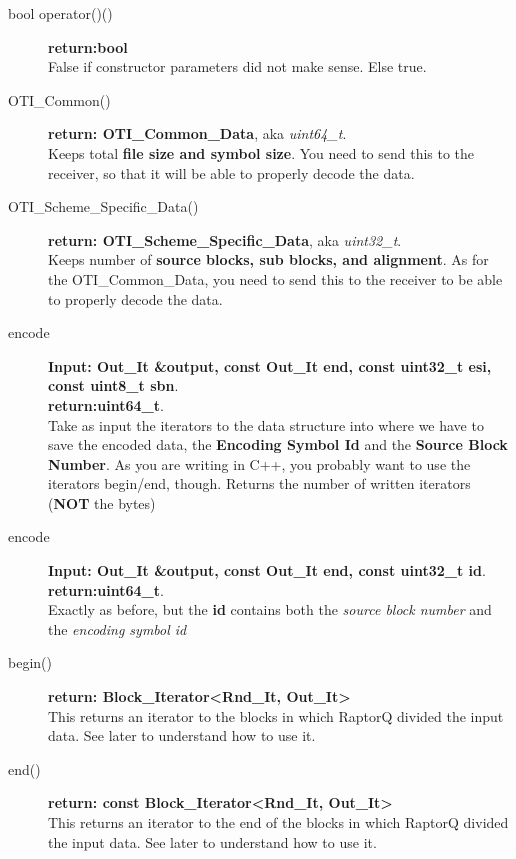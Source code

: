 \documentclass[11pt,a4paper]{refart}
\begin{document}
\begin{description}
\item[bool operator()()] \textbf{return:bool}\\
False if constructor parameters did not make sense. Else true.

\item[OTI\_Common()] \textbf{return: OTI\_Common\_Data}, aka \textit{uint64\_t}.\\
Keeps total \textbf{file size and symbol size}. You need to send this to the receiver, so that it will be able to properly decode the data.

\item[OTI\_Scheme\_Specific\_Data()] \textbf{return: OTI\_Scheme\_Specific\_Data}, aka \textit{uint32\_t}.\\
Keeps number of \textbf{source blocks, sub blocks, and alignment}. As for the OTI\_Common\_Data, you need to send this to the receiver to be able to
properly decode the data.

\item[encode] \textbf{Input: Out\_It \&output, const Out\_It end, const uint32\_t esi, const uint8\_t sbn}.\\
\textbf{return:uint64\_t}.\\
Take as input the iterators to the data structure into where we have to save the encoded data, the \textbf{Encoding Symbol Id} and the
\textbf{Source Block Number}. As you are writing in C++, you probably want to use the iterators begin/end, though. Returns the number of written
iterators (\textbf{NOT} the bytes)

\item[encode] \textbf{Input: Out\_It \&output, const Out\_It end, const uint32\_t id}.\\
\textbf{return:uint64\_t}.\\
Exactly as before, but the \textbf{id} contains both the \textit{source block number} and the \textit{encoding symbol id}

\item[begin()] \textbf{return: Block\_Iterator<Rnd\_It, Out\_It>}\\
This returns an iterator to the blocks in which RaptorQ divided the input data. See later to understand how to use it.
\item[end()] \textbf{return: const Block\_Iterator<Rnd\_It, Out\_It>}\\
This returns an iterator to the end of the blocks in which RaptorQ divided the input data. See later to understand how to use it.


\end{description}
\end{document}
